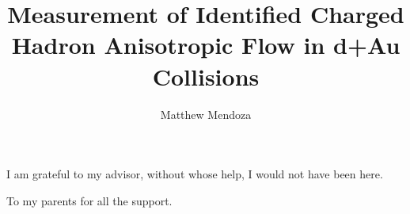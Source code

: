 \documentclass[oneside,final, letterpaper]{ucr}
\begin{document}

\title{Measurement of Identified Charged Hadron Anisotropic Flow in d+Au Collisions}
\author{Matthew Mendoza}

\maketitle
\copyrightpage{}
\approvalpage{}


\begin{frontmatter}

\begin{acknowledgements}
I am grateful to my advisor, without whose help, I would not have been here.
\end{acknowledgements}

\begin{dedication}
\null\vfil
{\large
\begin{center}
To my parents for all the support.
\end{center}}
\vfil\null
\end{dedication}



\tableofcontents
\listoffigures
\listoftables
\end{frontmatter}

\dsp












%


\nocite{*}
%
\ssp
 
 
\end{document}
